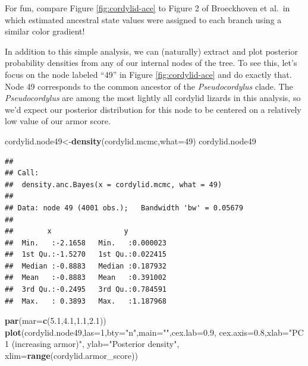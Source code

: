 \documentclass[fleqn,10pt,lineno]{wlpeerj} %
\newenvironment{Shaded}{\begin{snugshade}}{\end{snugshade}}
\newcommand{\AttributeTok}[1]{\textcolor[rgb]{0.13,0.29,0.53}{#1}}
\newcommand{\DecValTok}[1]{\textcolor[rgb]{0.00,0.00,0.81}{#1}}
\newcommand{\FloatTok}[1]{\textcolor[rgb]{0.00,0.00,0.81}{#1}}
\newcommand{\FunctionTok}[1]{\textcolor[rgb]{0.13,0.29,0.53}{\textbf{#1}}}
\newcommand{\NormalTok}[1]{#1}
\newcommand{\OtherTok}[1]{\textcolor[rgb]{0.56,0.35,0.01}{#1}}
\newcommand{\StringTok}[1]{\textcolor[rgb]{0.31,0.60,0.02}{#1}}
\begin{document}
For fun, compare Figure \ref{fig:cordylid-ace} to Figure 2 of Broeckhoven et al.~in which estimated ancestral state values were assigned to each branch using a similar color gradient!

In addition to this simple analysis, we can (naturally) extract and plot posterior probability densities from any of our internal nodes of the tree. To see this, let's focus on the node labeled ``49'' in Figure \ref{fig:cordylid-ace} and do exactly that. Node 49 corresponds to the common ancestor of the \emph{Pseudocordylus} clade. The \emph{Pseudocordylus} are among the most lightly all cordylid lizards in this analysis, so we'd expect our posterior distribution for this node to be centered on a relatively low value of our armor score.

\begin{Shaded}
\begin{Highlighting}[]
\NormalTok{cordylid.node49}\OtherTok{\textless{}{-}}\FunctionTok{density}\NormalTok{(cordylid.mcmc,}\AttributeTok{what=}\DecValTok{49}\NormalTok{)}
\NormalTok{cordylid.node49}
\end{Highlighting}
\end{Shaded}

\begin{verbatim}
## 
## Call:
##  density.anc.Bayes(x = cordylid.mcmc, what = 49)
## 
## Data: node 49 (4001 obs.);   Bandwidth 'bw' = 0.05679
## 
##        x                 y           
##  Min.   :-2.1658   Min.   :0.000023  
##  1st Qu.:-1.5270   1st Qu.:0.022415  
##  Median :-0.8883   Median :0.187932  
##  Mean   :-0.8883   Mean   :0.391002  
##  3rd Qu.:-0.2495   3rd Qu.:0.784591  
##  Max.   : 0.3893   Max.   :1.187968
\end{verbatim}

\begin{Shaded}
\begin{Highlighting}[]
\FunctionTok{par}\NormalTok{(}\AttributeTok{mar=}\FunctionTok{c}\NormalTok{(}\FloatTok{5.1}\NormalTok{,}\FloatTok{4.1}\NormalTok{,}\FloatTok{1.1}\NormalTok{,}\FloatTok{2.1}\NormalTok{))}
\FunctionTok{plot}\NormalTok{(cordylid.node49,}\AttributeTok{las=}\DecValTok{1}\NormalTok{,}\AttributeTok{bty=}\StringTok{"n"}\NormalTok{,}\AttributeTok{main=}\StringTok{""}\NormalTok{,}\AttributeTok{cex.lab=}\FloatTok{0.9}\NormalTok{,}
  \AttributeTok{cex.axis=}\FloatTok{0.8}\NormalTok{,}\AttributeTok{xlab=}\StringTok{"PC 1 (increasing armor)"}\NormalTok{,}
  \AttributeTok{ylab=}\StringTok{"Posterior density"}\NormalTok{,}
  \AttributeTok{xlim=}\FunctionTok{range}\NormalTok{(cordylid.armor\_score))}
\end{Highlighting}
\end{Shaded}
\end{document}
